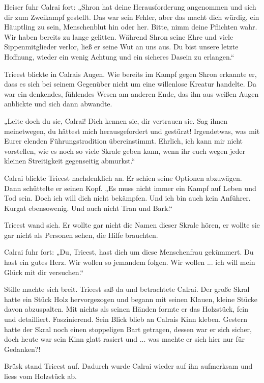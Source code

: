 Heiser fuhr Calrai fort: „Shron hat deine Herausforderung angenommen und sich dir zum Zweikampf gestellt. Das war sein Fehler, aber das macht dich würdig, ein Häuptling zu sein, Menschenblut hin oder her. Bitte, nimm deine Pflichten wahr. Wir haben bereits zu lange gelitten. Während Shron seine Ehre und viele Sippenmitglieder verlor, ließ er seine Wut an uns aus. Du bist unsere letzte Hoffnung, wieder ein wenig Achtung und ein sicheres Dasein zu erlangen.“

Trieest blickte in Calrais Augen. Wie bereits im Kampf gegen Shron erkannte er, dass es sich bei seinem Gegenüber nicht um eine willenlose Kreatur handelte. Da war ein denkendes, fühlendes Wesen am anderen Ende, das ihn aus weißen Augen anblickte und sich dann abwandte.

„Leite doch du sie, Calrai! Dich kennen sie, dir vertrauen sie. Sag ihnen meinetwegen, du hättest mich herausgefordert und gestürzt! Irgendetwas, was mit Eurer elenden Führungstradition übereinstimmt. Ehrlich, ich kann mir nicht vorstellen, wie es noch so viele Skrale geben kann, wenn ihr euch wegen jeder kleinen Streitigkeit gegenseitig abmurkst.“

Calrai blickte Trieest nachdenklich an. Er schien seine Optionen abzuwägen. Dann schüttelte er seinen Kopf. „Es muss nicht immer ein Kampf auf Leben und Tod sein. Doch ich will dich nicht bekämpfen. Und ich bin auch kein Anführer. Kurgat ebensowenig. Und auch nicht Tran und Bark.“

Trieest wand sich. Er wollte gar nicht die Namen dieser Skrale hören, er wollte sie gar nicht als Personen sehen, die Hilfe brauchten.

Calrai fuhr fort: „Du, Trieest, hast dich um diese Menschenfrau gekümmert. Du hast ein gutes Herz. Wir wollen so jemandem folgen. Wir wollen ... ich will mein Glück mit dir versuchen.“

Stille machte sich breit. Trieest saß da und betrachtete Calrai. Der große Skral hatte ein Stück Holz hervorgezogen und begann mit seinen Klauen, kleine Stücke davon abzuspalten. Mit nichts als seinen Händen formte er das Holzstück, fein und detailliert. Faszinierend. Sein Blick blieb an Calrais Kinn kleben. Gestern hatte der Skral noch einen stoppeligen Bart getragen, dessen war er sich sicher, doch heute war sein Kinn glatt rasiert und ... was machte er sich hier nur für Gedanken?!

Brüsk stand Trieest auf. Dadurch wurde Calrai wieder auf ihn aufmerksam und liess vom Holzstück ab.

